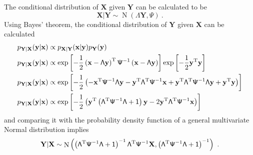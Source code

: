 \documentclass[12pt]{report}
\DeclareMathOperator{\normal}{N}
\newcommand{\T}{^\textup{T}}
\newcommand{\vect}[1]{\mathbf{#1}}
\newcommand{\matr}[1]{\mathsf{#1}}
\begin{document}
The conditional distribution of $\vect{X}$ given $\vect{Y}$ can be calculated to be
\begin{equation}
\vect{X}|\vect{Y}\sim\normal\left(\matr{\Lambda}\vect{Y},\matr{\Psi}\right) \ .
\label{eq:factor_analysis_x_given_y_dist}
\end{equation}
Using Bayes' theorem, the conditional distribution of $\vect{Y}$ given $\vect{X}$ can be calculated
\begin{align*}
p_{\vect{Y}|\vect{X}}(\vect{y}|\vect{x}) &\propto p_{\vect{X}|\vect{Y}}(\vect{x}|\vect{y}) p_{\vect{Y}}(\vect{y})
\\
p_{\vect{Y}|\vect{X}}(\vect{y}|\vect{x}) &\propto \exp\left[-\frac{1}{2}\left(\vect{x}-\matr{\Lambda}\vect{y}\right)\T\matr{\Psi}^{-1}\left(\vect{x}-\matr{\Lambda}\vect{y}\right)\right]
\exp\left[-\frac{1}{2}\vect{y}\T\vect{y}\right]
\\
p_{\vect{Y}|\vect{X}}(\vect{y}|\vect{x}) &\propto \exp \left[-\frac{1}{2}\left(-\vect{x}\T\matr{\Psi}^{-1}\matr{\Lambda}\vect{y}-\vect{y}\T\matr{\Lambda}\T\matr{\Psi}^{-1}\vect{x}+\vect{y}\T\matr{\Lambda}\T\matr{\Psi}^{-1}\matr{\Lambda}\vect{y}+\vect{y}\T\vect{y}\right)\right]
\\
p_{\vect{Y}|\vect{X}}(\vect{y}|\vect{x}) &\propto \exp \left[-\frac{1}{2}\left(\vect{y}\T\left(\matr{\Lambda}\T\matr{\Psi}^{-1}\matr{\Lambda}+\matr{1}\right)\vect{y}-2\vect{y}\T\matr{\Lambda}\T\matr{\Psi}^{-1}\vect{x}\right)\right]
\end{align*}
and comparing it with the probability density function of a general multivariate Normal distribution implies
\begin{equation}
\vect{Y}|\vect{X}\sim\normal\left(\left(\matr{\Lambda}\T\matr{\Psi}^{-1}\matr{\Lambda}+\matr{1}\right)^{-1}\matr{\Lambda}\T\matr{\Psi}^{-1}\vect{X},\left(\matr{\Lambda}\T\matr{\Psi}^{-1}\matr{\Lambda}+\matr{1}\right)^{-1}\right) \ .
\label{eq:factor_analysis_y_given_x_dist}
\end{equation}
\end{document}
